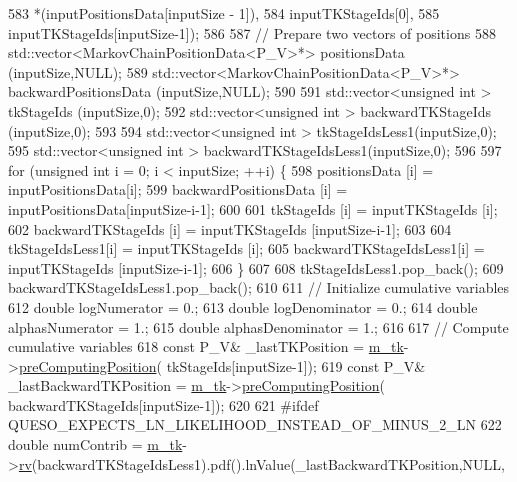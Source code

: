\begin{DoxyCode}
583                                          *(inputPositionsData[inputSize - 1]),
584                                          inputTKStageIds[0],
585                                          inputTKStageIds[inputSize-1]);
586 
587   \textcolor{comment}{// Prepare two vectors of positions}
588   std::vector<MarkovChainPositionData<P\_V>*>         positionsData  (inputSize,NULL);
589   std::vector<MarkovChainPositionData<P\_V>*> backwardPositionsData  (inputSize,NULL);
590 
591   std::vector<unsigned int                        >         tkStageIds     (inputSize,0);
592   std::vector<unsigned int                        > backwardTKStageIds     (inputSize,0);
593 
594   std::vector<unsigned int                        >         tkStageIdsLess1(inputSize,0);
595   std::vector<unsigned int                        > backwardTKStageIdsLess1(inputSize,0);
596 
597   \textcolor{keywordflow}{for} (\textcolor{keywordtype}{unsigned} \textcolor{keywordtype}{int} i = 0; i < inputSize; ++i) \{
598             positionsData  [i] = inputPositionsData[i];
599     backwardPositionsData  [i] = inputPositionsData[inputSize-i-1];
600 
601             tkStageIds     [i] = inputTKStageIds   [i];
602     backwardTKStageIds     [i] = inputTKStageIds   [inputSize-i-1];
603 
604             tkStageIdsLess1[i] = inputTKStageIds   [i];
605     backwardTKStageIdsLess1[i] = inputTKStageIds   [inputSize-i-1];
606   \}
607 
608           tkStageIdsLess1.pop\_back();
609   backwardTKStageIdsLess1.pop\_back();
610 
611   \textcolor{comment}{// Initialize cumulative variables}
612   \textcolor{keywordtype}{double} logNumerator      = 0.;
613   \textcolor{keywordtype}{double} logDenominator    = 0.;
614   \textcolor{keywordtype}{double} alphasNumerator   = 1.;
615   \textcolor{keywordtype}{double} alphasDenominator = 1.;
616 
617   \textcolor{comment}{// Compute cumulative variables}
618   \textcolor{keyword}{const} P\_V& \_lastTKPosition         = \hyperlink{class_q_u_e_s_o_1_1_metropolis_hastings_s_g_a26e9680abddfb793486c995fa16f8c2d}{m\_tk}->\hyperlink{class_q_u_e_s_o_1_1_base_t_k_group_aa864c6cc07327a698f91cef72cdc35aa}{preComputingPosition}(        
      tkStageIds[inputSize-1]);
619   \textcolor{keyword}{const} P\_V& \_lastBackwardTKPosition = \hyperlink{class_q_u_e_s_o_1_1_metropolis_hastings_s_g_a26e9680abddfb793486c995fa16f8c2d}{m\_tk}->\hyperlink{class_q_u_e_s_o_1_1_base_t_k_group_aa864c6cc07327a698f91cef72cdc35aa}{preComputingPosition}(
      backwardTKStageIds[inputSize-1]);
620 
621 \textcolor{preprocessor}{#ifdef QUESO\_EXPECTS\_LN\_LIKELIHOOD\_INSTEAD\_OF\_MINUS\_2\_LN}
622 \textcolor{preprocessor}{}  \textcolor{keywordtype}{double} numContrib = \hyperlink{class_q_u_e_s_o_1_1_metropolis_hastings_s_g_a26e9680abddfb793486c995fa16f8c2d}{m\_tk}->\hyperlink{class_q_u_e_s_o_1_1_base_t_k_group_a6bd8e0bec0105471aad8801cbf1a0851}{rv}(backwardTKStageIdsLess1).pdf().lnValue(\_lastBackwardTKPosition,NULL,

\end{DoxyCode}
